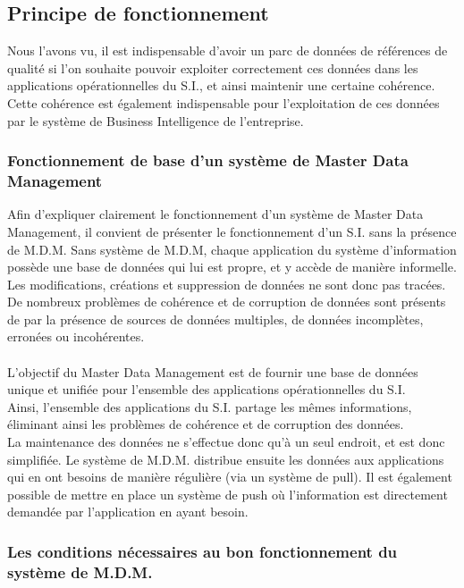 \subsection{Principe de fonctionnement}

Nous l'avons vu, il est indispensable d'avoir un parc de données de références de qualité si l'on souhaite pouvoir exploiter correctement ces données dans les applications opérationnelles du S.I., et ainsi maintenir une certaine cohérence. Cette cohérence est également indispensable pour l'exploitation de ces données par le système de Business Intelligence de l'entreprise.\\

\subsubsection{Fonctionnement de base d'un système de Master Data Management}

Afin d'expliquer clairement le fonctionnement d'un système de Master Data Management, il convient de présenter le fonctionnement d'un S.I. sans la présence de M.D.M.
Sans système de M.D.M, chaque application du système d'information possède une base de données qui lui est propre, et y accède de manière informelle.
Les modifications, créations et suppression de données ne sont donc pas tracées. De nombreux problèmes de cohérence et de corruption de données sont présents de par la présence de sources de données multiples, de données incomplètes, erronées ou incohérentes.\\\\

L'objectif du Master Data Management est de fournir une base de données unique et unifiée  pour l'ensemble des applications opérationnelles du S.I.\\
Ainsi, l'ensemble des applications du S.I. partage les mêmes informations, éliminant ainsi les problèmes de cohérence et de corruption des données.\\
La maintenance des données ne s'effectue donc qu'à un seul endroit, et est donc simplifiée. Le système de M.D.M. distribue ensuite les données aux applications qui en ont besoins de manière régulière (via un système de pull). Il est également possible de mettre en place un système de push où l'information est directement demandée par l'application en ayant besoin.

\subsubsection{Les conditions nécessaires au bon fonctionnement du système de M.D.M.}

